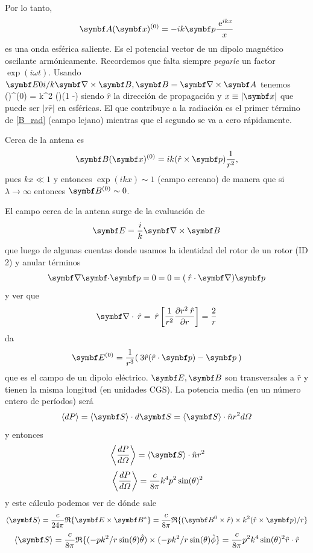 \documentclass[10pt,oneside]{CBFT_book}
\begin{document}

Por lo tanto,
\[
	\vb{A}(\vb{x})^{(0)} = - i k \vb{p} \frac{\euler^{ikx}}{x}
\]
es una onda esférica saliente. Es el potencial vector  de un dipolo magnético oscilante armónicamente.
Recordemos que falta siempre {\it pegarle} un factor $\exp(i\omega t)$. Usando $\vb{E} 0 i/k \rotorm{B}, 
\vb{B} = \rotorm{A}$ tenemos 
\be
	()^{(0)} = k^2 (\times{})\left(1 -\right)
	\label{B_rad}
\ee
siendo $\hat{r}$ la dirección de propagación y $x\equiv|\vb{x}|$ que puede ser $|r\hat{r}|$ en esféricas.
El que contribuye a la radiación es el primer término de \eqref{B_rad} (campo lejano) mientras que el segundo
se va a cero rápidamente.

Cerca de la antena es 
\[
	\vb{B}(\vb{x})^{(0)} = i k (\hat{r}\times\vb{p})\frac{1}{r^2}, 
\]
pues $kx\ll 1$ y entonces $\exp(ikx) \sim 1$ (campo cercano) de manera que si $\lambda \to \infty$ entonces
$\vb{B}^{(0)} \sim 0$. 

El campo  cerca de la antena surge de la evaluación de
\[
	\vb{E} = \frac{i}{k}\rotorm{B} 
\]
que luego de algunas cuentas donde usamos la identidad del rotor de un rotor (ID 2) y
anular términos
\[
	\divem{p}=0 = 0 = (\rver\cdot\Nabla)\vb{p}
\]
y ver que
\[
	\Nabla\cdot\rver = \rver \left[ \frac{1}{r^2}\dpar{r^2\rver}{r} \right] = \frac{2}{r}
\]
da
\[
	\vb{E}^{(0)} = \frac{1}{r^3}( \: 3\hat{r}(\hat{r}\cdot\vb{p}) - \vb{p} \:)
\]
que es el campo de un dipolo eléctrico. $\vb{E},\vb{B}$ son transversales a $\hat{r}$ y tienen la misma 
longitud (en unidades CGS).
La potencia media (en un número entero de períodos) será 
\[
	\langle dP \rangle = \langle\vb{S}\rangle\cdot d\vb{S} = \langle \vb{S}\rangle\cdot\hat{n}r^2 d\Omega
\]
y entonces
\[
	\vm{ \frac{dP}{d\Omega} } = \langle\vb{S}\rangle\cdot\hat{n}r^2 
\]
\[
	\:\left\langle  \frac{dP}{d\Omega}  \right\rangle = \frac{c}{8\pi} k^4 p^2 \sin(\theta)^2 
\]
y este cálculo podemos ver de dónde sale 
\[
	\langle\vb{S}\rangle = \frac{c}{2 4 \pi} \re\{ \vb{E}\times\vb{B}^* \} =
		\frac{c}{8\pi} \re\{ ( \vb{B}^0 \times \hat{r} )\times k^2(\hat{r} \times \vb{p})/r \}
\]
\[
	\langle\vb{S}\rangle =
	\frac{c}{8\pi} \re\{(-p k^2/r \sin(\theta) \hat{\theta})\times(-p k^2/r\sin(\theta)\hat{\phi} \}
	= \frac{c}{8\pi} p^2 k^4 \sin(\theta)^2 \hat{r}\cdot\hat{r}
\]
\end{document}
